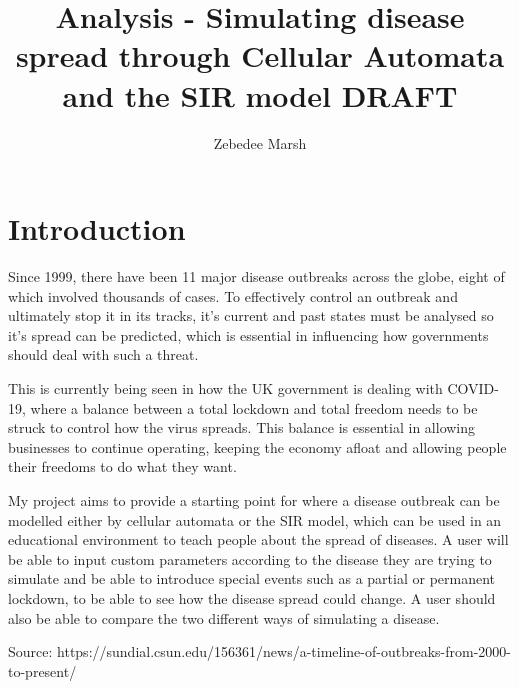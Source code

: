 \documentclass[11pt, a4paper]{article}
\author{Zebedee Marsh}
\title{Analysis - Simulating disease spread through Cellular Automata and the SIR model DRAFT}
\begin{document}
    
\maketitle
\tableofcontents
\newpage

\section{Introduction}
Since 1999, there have been 11 major disease outbreaks across the globe, eight of which involved thousands of cases. To effectively control an outbreak and ultimately stop it in its tracks, it's current and past states must be analysed so it's spread can be predicted, which is essential in influencing how governments should deal with such a threat.

This is currently being seen in how the UK government is dealing with COVID-19, where a balance between a total lockdown and total freedom needs to be struck to control how the virus spreads. This balance is essential in allowing businesses to continue operating, keeping the economy afloat and allowing people their freedoms to do what they want.

My project aims to provide a starting point for where a disease outbreak can be modelled either by cellular automata or the SIR model, which can be used in an educational environment to teach people about the spread of diseases. A user will be able to input custom parameters according to the disease they are trying to simulate and be able to introduce special events such as a partial or permanent lockdown, to be able to see how the disease spread could change. A user should also be able to compare the two different ways of simulating a disease.

Source: https://sundial.csun.edu/156361/news/a-timeline-of-outbreaks-from-2000-to-present/
\end{document}
